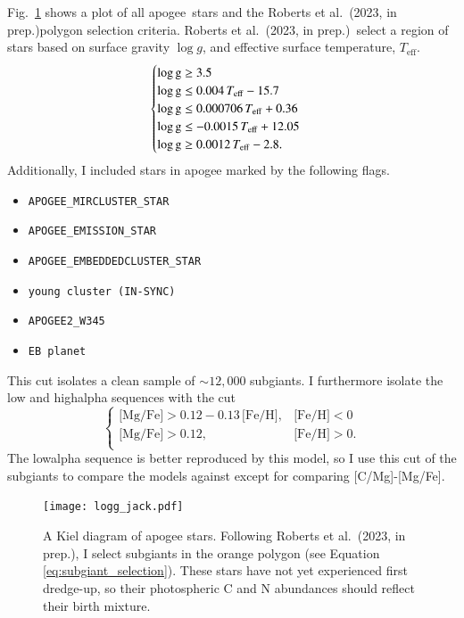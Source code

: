 \documentclass[12pt,oneside,letterpaper]{report}
\newcommand{\apogee}{\gls{apogee}}
\newcommand{\citetjack}{Roberts et al.~(2023, in prep.)}
\newcommand{\caafe}{[C/Mg]-[Mg/Fe]}
\newcommand{\about}[1]{${\sim} #1$}
\begin{document}
Fig.~\ref{fig:subgiant_selection} shows a plot of all \apogee\ stars and the \citetjack polygon selection criteria. 
 \citetjack~select a region of stars based on surface gravity $\log g$, and effective surface temperature, $T_\text{eff}$.
 \begin{equation}
    \begin{cases} \label{eq:subgiant_selection}
        \log \text{g} \geq 3.5 \\
        \log \text{g} \leq 0.004\,T_{\rm eff} - 15.7 \\
        \log \text{g} \leq 0.000706\,T_{\rm eff} + 0.36 \\
        \log \text{g} \leq -0.0015\,T_{\rm eff} + 12.05 \\
        \log \text{g} \geq 0.0012\,T_{\rm eff} - 2.8. \\
    \end{cases}
\end{equation}
Additionally, I included stars in \apogee{} marked by the following flags.
\begin{itemize}
\item \verb|APOGEE_MIRCLUSTER_STAR|
\item \verb|APOGEE_EMISSION_STAR|
\item \verb|APOGEE_EMBEDDEDCLUSTER_STAR|
\item \verb|young cluster (IN-SYNC)|
\item \verb|APOGEE2_W345|
\item \verb|EB planet|
\end{itemize}
This cut isolates a clean sample of \about{12,000} \gls{subgiant}s.
I furthermore isolate the low and \gls{highalpha} sequences with the cut
\begin{equation}\label{eq:high_alpha}
\begin{cases}
\text{[Mg/Fe]} >0.12-0.13\,\text{[Fe/H]}, & \text{[Fe/H]}<0\\
\text{[Mg/Fe]} >0.12, & \text{[Fe/H]}>0. \\
\end{cases}
\end{equation}
The \gls{lowalpha} sequence is better reproduced by this model, so I use this cut of the subgiants to compare the models against except for comparing \caafe. 




\begin{figure}
    \centering
    \texttt{[image: logg\_jack.pdf]}
    \caption[Subgiant Selection]{
        A Kiel diagram of \apogee{} stars. Following \citetjack, I select \gls{subgiant}s in the orange polygon (see Equation \ref{eq:subgiant_selection}). These stars have not yet experienced first dredge-up, so their photospheric C and N abundances should reflect their birth mixture.
    }
    \label{fig:subgiant_selection}
\end{figure}
\end{document}
